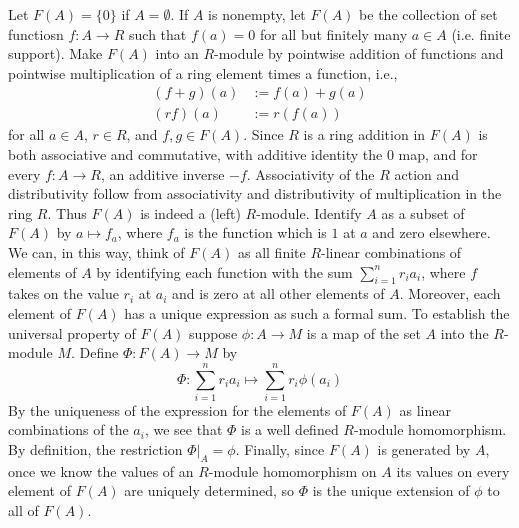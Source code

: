 \documentclass[12pt, a4paper, twoside, openright, titlepage]{book}
\begin{document}
\begin{proof*}{}{}
    Let $F(A) = \{0\}$ if $A = \emptyset$. If $A$ is nonempty, let $F(A)$ be the collection of set functiosn $f:A\rightarrow R$ such that $f(a) = 0$ for all but finitely many $a \in A$ (i.e. finite support). Make $F(A)$ into an $R$-module by pointwise addition of functions and pointwise multiplication of a ring element times a function, i.e., \begin{align*}
        (f+g)(a) &:= f(a)+g(a) \\
        (rf)(a) &:= r(f(a)) 
    \end{align*}
    for all $a \in A$, $r \in R$, and $f,g \in F(A)$. Since $R$ is a ring addition in $F(A)$ is both associative and commutative, with additive identity the $0$ map, and for every $f:A\rightarrow R$, an additive inverse $-f$. Associativity of the $R$ action and distributivity follow from associativity and distributivity of multiplication in the ring $R$. Thus $F(A)$ is indeed a (left) $R$-module. Identify $A$ as a subset of $F(A)$ by $a \mapsto f_a$, where $f_a$ is the function which is $1$ at $a$ and zero elsewhere. We can, in this way, think of $F(A)$ as all finite $R$-linear combinations of elements of $A$ by identifying each function with the sum $\sum_{i=1}^nr_ia_i$, where $f$ takes on the value $r_i$ at $a_i$ and is zero at all other elements of $A$. Moreover, each element of $F(A)$ has a unique expression as such a formal sum. To establish the universal property of $F(A)$ suppose $\phi:A\rightarrow M$ is a map of the set $A$ into the $R$-module $M$. Define $\Phi:F(A)\rightarrow M$ by \begin{equation*}
        \Phi:\sum\limits_{i=1}^nr_ia_i\mapsto\sum\limits_{i=1}^nr_i\phi(a_i)
    \end{equation*}
    By the uniqueness of the expression for the elements of $F(A)$ as linear combinations of the $a_i$, we see that $\Phi$ is a well defined $R$-module homomorphism. By definition, the restriction $\Phi\vert_A = \phi$. Finally, since $F(A)$ is generated by $A$, once we know the values of an $R$-module homomorphism on $A$ its values on every element of $F(A)$ are uniquely determined, so $\Phi$ is the unique extension of $\phi$ to all of $F(A)$.
\end{proof*}
\end{document}
